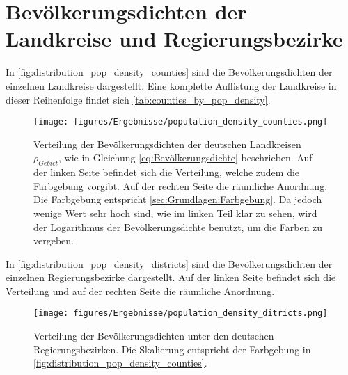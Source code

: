 \section{Bevölkerungsdichten der Landkreise und Regierungsbezirke}
In \autoref{fig:distribution_pop_density_counties} sind die Bevölkerungsdichten der einzelnen Landkreise dargestellt. Eine komplette Auflistung der Landkreise in dieser Reihenfolge findet sich \autoref{tab:counties_by_pop_density}.

\begin{figure}[H]
    \centering
    \texttt{[image: figures/Ergebnisse/population\_density\_counties.png]}
    \caption{Verteilung der Bevölkerungsdichten  der deutschen Landkreisen $\rho_{Gebiet}$, wie in Gleichung \autoref{eq:Bevölkerungsdichte} beschrieben. Auf der linken Seite befindet sich die Verteilung, welche zudem die Farbgebung vorgibt. Auf der rechten Seite die räumliche Anordnung. Die Farbgebung entspricht \autoref{sec:Grundlagen:Farbgebung}. Da jedoch wenige Wert sehr hoch sind, wie im linken Teil klar zu sehen, wird der Logarithmus der Bevölkerungsdichte benutzt, um die Farben zu vergeben.}
    \label{fig:distribution_pop_density_counties}
\end{figure}

In \autoref{fig:distribution_pop_density_districts} sind die Bevölkerungsdichten der einzelnen Regierungsbezirke dargestellt. Auf der linken Seite befindet sich die Verteilung und auf der rechten Seite die räumliche Anordnung.

\begin{figure}[H]
    \centering
    \texttt{[image: figures/Ergebnisse/population\_density\_ditricts.png]}
    \caption{Verteilung der Bevölkerungsdichten unter den deutschen Regierungsbezirken. Die Skalierung entspricht der Farbgebung in \autoref{fig:distribution_pop_density_counties}.}
    \label{fig:distribution_pop_density_districts}
\end{figure}